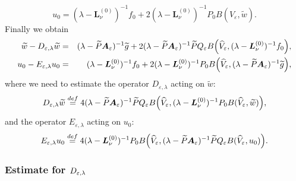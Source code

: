 \documentclass[11pt]{article}
\begin{document}
\begin{equation*}
u_{0}=(\lambda -\boldsymbol{L}_{\nu }^{(0)})^{-1}f_{0}+2(\lambda -%
\boldsymbol{L}_{\nu }^{(0)})^{-1}P_{0}B(\widehat{V}_{\varepsilon },%
\widetilde{w}).
\end{equation*}%
Finally we obtain%
\begin{eqnarray*}
\widetilde{w}-D_{\varepsilon ,\lambda }\widetilde{w} &=&(\lambda -\widetilde{%
P}\boldsymbol{A}_{\varepsilon })^{-1}\widetilde{g}+2(\lambda -\widetilde{P}%
\boldsymbol{A}_{\varepsilon })^{-1}\widetilde{P}Q_{\varepsilon }B \Bigl( \widehat{V}%
_{\varepsilon },(\lambda -\boldsymbol{L}_{\nu }^{(0)})^{-1}f_{0} \Bigr), \\
u_{0}-E_{\varepsilon ,\lambda }u_{0} &=&(\lambda -\boldsymbol{L}_{\nu
}^{(0)})^{-1}f_{0}+2(\lambda -\boldsymbol{L}_{\nu }^{(0)})^{-1}P_{0}B \Bigl( %
\widehat{V}_{\varepsilon },(\lambda -\widetilde{P}\boldsymbol{A}%
_{\varepsilon })^{-1}\widetilde{g} \Bigr),
\end{eqnarray*}%
where we need to estimate the operator $D_{\varepsilon ,\lambda }$ acting on 
$\widetilde{w}:$ 
\begin{equation}
D_{\varepsilon ,\lambda }\widetilde{w}\overset{def}{=}4(\lambda -\widetilde{P%
}\boldsymbol{A}_{\varepsilon })^{-1}\widetilde{P}Q_{\varepsilon }B \Bigl(\widehat{V%
}_{\varepsilon },(\lambda -\boldsymbol{L}_{\nu }^{(0)})^{-1}P_{0}B(\widehat{V%
}_{\varepsilon },\widetilde{w}) \Bigr),  \label{def Deps}
\end{equation}%
and the operator $E_{\varepsilon ,\lambda }$ acting on $u_{0}:$%
\begin{equation}
E_{\varepsilon ,\lambda }u_{0}\overset{def}{=}4(\lambda -\boldsymbol{L}_{\nu
}^{(0)})^{-1}P_{0}B \Bigl( \widehat{V}_{\varepsilon },(\lambda -\widetilde{P}%
\boldsymbol{A}_{\varepsilon })^{-1}\widetilde{P}Q_{\varepsilon }B(\widehat{V}%
_{\varepsilon },u_{0}) \Bigr).  \label{def Eeps}
\end{equation}



\subsubsection{Estimate for $D_{\protect\varepsilon ,\protect\lambda }$}

\end{document}
